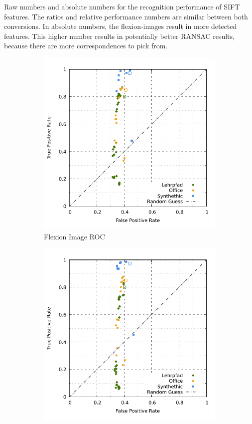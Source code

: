 Raw numbers and absolute numbers for the recognition performance of SIFT features.
The ratios and relative performance numbers are similar between both conversions.
In absolute numbers, the \glspl{flexion-image} result in more detected features.
This higher number results in potentially better RANSAC results, because there are more correspondences to pick from.
\begin{figure}[H]
\begin{subfigure}[t]{0.45\linewidth}
    \includegraphics[width=\linewidth]{chapter06/results/SIFT/flexion/roc.pdf}%
    \caption{Flexion Image ROC}
\end{subfigure}\quad
\begin{subfigure}[t]{0.45\linewidth}
    \includegraphics[width=\linewidth]{chapter06/results/SIFT/bearing/roc.pdf}

\end{subfigure}
\end{figure}
